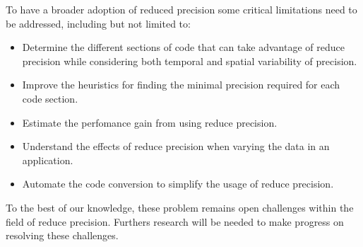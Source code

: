 To have a broader adoption of reduced precision some critical limitations need to 
be addressed, including but not limited to:
\begin{itemize}
	\item Determine the different sections of code that can take advantage of reduce precision 
	      while considering both temporal and spatial variability of precision.
	\item Improve the heuristics for finding the minimal precision required for each code section.
	\item Estimate the perfomance gain from using reduce precision.
	\item Understand the effects of reduce precision when varying the data in an application.
	\item Automate the code conversion to simplify the usage of reduce precision.
\end{itemize}
To the best of our knowledge, these problem remains open challenges within the field of reduce precision.
Furthers research will be needed to make progress on resolving these challenges.
